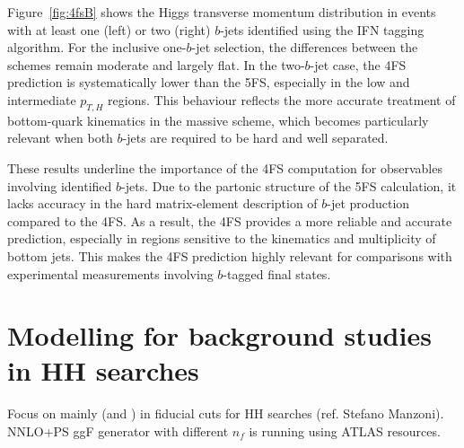 \documentclass[11pt,a4paper]{article}
\begin{document}

Figure~\ref{fig:4fsB} shows the Higgs transverse momentum distribution in events with at least one (left) or two (right) $b$-jets identified using the IFN tagging algorithm. For the inclusive one-$b$-jet selection, the differences between the schemes remain moderate and largely flat. In the two-$b$-jet case, the 4FS prediction is systematically lower than the 5FS, especially in the low and intermediate $p_{T,H}$ regions. This behaviour reflects the more accurate treatment of bottom-quark kinematics in the massive scheme, which becomes particularly relevant when both $b$-jets are required to be hard and well separated.

These results underline the importance of the 4FS computation for observables involving identified $b$-jets. Due to the partonic structure of the 5FS calculation, it lacks accuracy in the hard matrix-element description of $b$-jet production compared to the 4FS. As a result, the 4FS provides a more reliable and accurate prediction, especially in regions sensitive to the kinematics and multiplicity of bottom jets. This makes the 4FS prediction highly relevant for comparisons with experimental measurements involving $b$-tagged final states.
\section{Modelling \bbH{} for background studies in HH searches}\label{sec:HH}
Focus on  mainly (and ) in fiducial cuts for HH searches (ref. Stefano Manzoni). NNLO+PS ggF generator with different $n_f$ is running using ATLAS resources.
\end{document}
